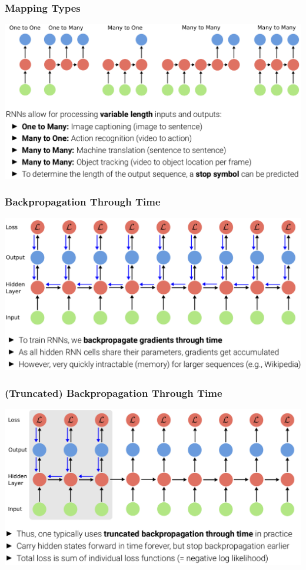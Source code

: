 \documentclass[10pt]{beamer}
\begin{document}
\begin{frame}
  \frametitle{Mapping Types}
\begin{center}
\includegraphics[width=.9\textwidth]{images/s5}
\end{center}
\end{frame}


\begin{frame}
  \frametitle{Backpropagation Through Time}
\begin{center}
\includegraphics[width=.9\textwidth]{images/s6}
\end{center}
\end{frame}

\begin{frame}
  \frametitle{(Truncated) Backpropagation Through Time}
\begin{center}
\includegraphics[width=.9\textwidth]{images/s7}
\end{center}
\end{frame}
\end{document}
